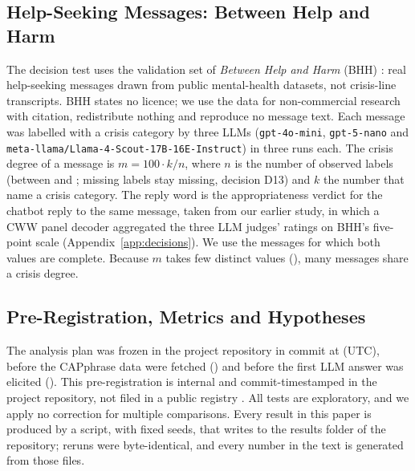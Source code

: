 \begin{table}[t]
\caption{LLM elicitation per model and prompt: valid answers, share missing after re-asks, answers that needed a
re-ask, final attempts that hit the token cap, answers superseded under D19, and terms excluded for fewer than
\WMinN{} valid answers.}
\label{tab:elicitation}

\end{table}

\subsection{Help-Seeking Messages: Between Help and Harm}
\label{sec:design-bhh}

The decision test uses the validation set of \emph{Between Help and Harm} (BHH) \citep{arnaizrodriguez2026help}: real
help-seeking messages drawn from public mental-health datasets, not crisis-line transcripts.
BHH states no licence; we use the data for non-commercial research with citation, redistribute nothing and reproduce no
message text.
Each message was labelled with a crisis category by three LLMs (\texttt{gpt-4o-mini}, \texttt{gpt-5-nano} and
\texttt{meta-llama/Llama-4-}\allowbreak\texttt{Scout-17B-16E-Instruct}) in three runs each.
The crisis degree of a message is $m = 100 \cdot k / n$, where $n$ is the number of observed labels (between
\WthreeMinObserved{} and \WthreeMaxObserved{}; missing labels stay missing, decision D13) and $k$ the number that name a
crisis category.
The reply word is the appropriateness verdict for the chatbot reply to the same message, taken from our earlier study,
in which a CWW panel decoder aggregated the three LLM judges' ratings on BHH's five-point scale
(Appendix~\ref{app:decisions}).
We use the \WthreeNItems{} messages for which both values are complete.
Because $m$ takes few distinct values (\WthreeNDistinctM{}), many messages share a crisis degree.

\subsection{Pre-Registration, Metrics and Hypotheses}
\label{sec:design-plan}

The analysis plan was frozen in the project repository in commit \PlanWordsCommit{} at \PlanWordsUtc{} (UTC), before
the CAPphrase data were fetched (\CapphraseFetchedUtc{}) and before the first LLM answer was elicited
(\ElicitStartUtc{}).
This pre-registration is internal and commit-timestamped in the project repository, not filed in a public registry
\citep{nosek2018preregistration}.
All tests are exploratory, and we apply no correction for multiple comparisons.
Every result in this paper is produced by a script, with fixed seeds, that writes to the results folder of the
repository; reruns were byte-identical, and every number in the text is generated from those files.

